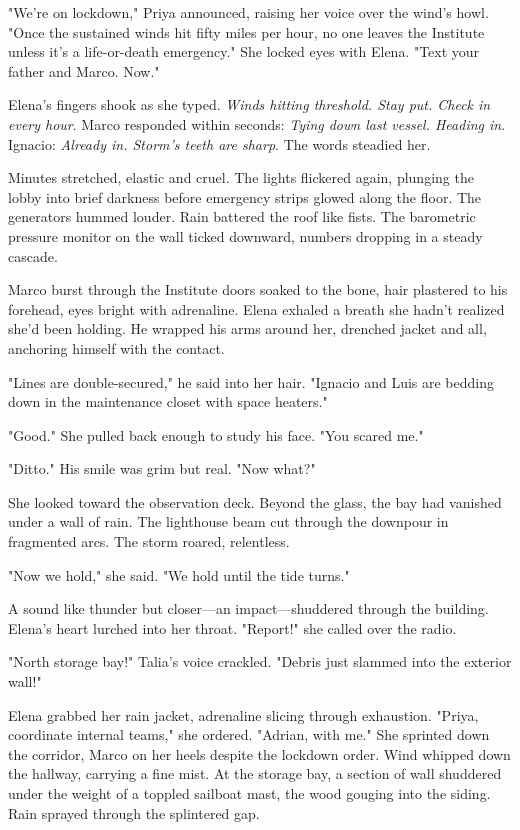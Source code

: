 "We're on lockdown," Priya announced, raising her voice over the wind's howl. "Once the sustained winds hit fifty miles per hour, no one leaves the Institute unless it's a life-or-death emergency." She locked eyes with Elena. "Text your father and Marco. Now."

Elena's fingers shook as she typed. \textit{Winds hitting threshold. Stay put. Check in every hour}. Marco responded within seconds: \textit{Tying down last vessel. Heading in}. Ignacio: \textit{Already in. Storm's teeth are sharp}. The words steadied her.

Minutes stretched, elastic and cruel. The lights flickered again, plunging the lobby into brief darkness before emergency strips glowed along the floor. The generators hummed louder. Rain battered the roof like fists. The barometric pressure monitor on the wall ticked downward, numbers dropping in a steady cascade.

Marco burst through the Institute doors soaked to the bone, hair plastered to his forehead, eyes bright with adrenaline. Elena exhaled a breath she hadn't realized she'd been holding. He wrapped his arms around her, drenched jacket and all, anchoring himself with the contact.

"Lines are double-secured," he said into her hair. "Ignacio and Luis are bedding down in the maintenance closet with space heaters."

"Good." She pulled back enough to study his face. "You scared me."

"Ditto." His smile was grim but real. "Now what?"

She looked toward the observation deck. Beyond the glass, the bay had vanished under a wall of rain. The lighthouse beam cut through the downpour in fragmented arcs. The storm roared, relentless.

"Now we hold," she said. "We hold until the tide turns."

A sound like thunder but closer—an impact—shuddered through the building. Elena's heart lurched into her throat. "Report!" she called over the radio.

"North storage bay!" Talia's voice crackled. "Debris just slammed into the exterior wall!"

Elena grabbed her rain jacket, adrenaline slicing through exhaustion. "Priya, coordinate internal teams," she ordered. "Adrian, with me." She sprinted down the corridor, Marco on her heels despite the lockdown order. Wind whipped down the hallway, carrying a fine mist. At the storage bay, a section of wall shuddered under the weight of a toppled sailboat mast, the wood gouging into the siding. Rain sprayed through the splintered gap.


